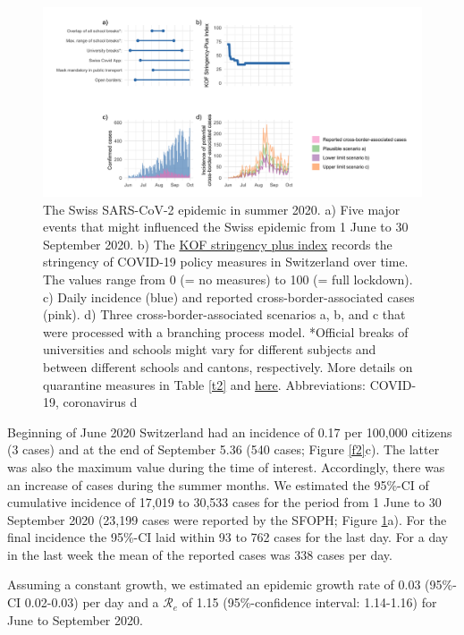 \documentclass[10pt, a4paper, twoside]{article}
\begin{document}
\begin{multicols}{2}
\begin{figure}
\centering
\includegraphics[scale=0.15]{Figure1_2021-06-02.png}
\caption{The Swiss SARS-CoV-2 epidemic in summer 2020.
a) Five major events that might influenced the Swiss epidemic from 1 June to 30 September 2020.
b) The \href{https://kof.ethz.ch/en/forecasts-and-indicators/indicators/kof-stringency-index.html}{KOF stringency plus index} records the stringency of COVID-19 policy measures in Switzerland over time.
The values range from 0 (= no measures) to 100 (= full lockdown).
c) Daily incidence (blue) and reported cross-border-associated cases (pink).
d) Three cross-border-associated scenarios a, b, and c that were processed with a branching process model.
*Official breaks of universities and schools might vary for different subjects and between different schools and cantons, respectively.
More details on quarantine measures in Table \ref{t2} and \href{https://www.fedlex.admin.ch/eli/cc/2021/61/de}{here}.
Abbreviations: COVID-19, coronavirus d}
\label{f1}
\end{figure}

Beginning of June 2020 Switzerland had an incidence of 0.17 per 100,000 citizens (3 cases) and at the end of September 5.36 (540 cases; Figure \ref{f2}c).
The latter was also the maximum value during the time of interest.
Accordingly, there was an increase of cases during the summer months.
We estimated the 95\%-CI of cumulative incidence of 17,019 to 30,533 cases for the period from 1 June to 30 September 2020 (23,199 cases were reported by the SFOPH; Figure \ref{f1}a).
For the final incidence the 95\%-CI laid within 93 to 762 cases for the last day.
For a day in the last week the mean of the reported cases was 338 cases per day.

Assuming a constant growth, we estimated an epidemic growth rate of 0.03 (95\%-CI 0.02-0.03) per day and a $\mathcal{R}_e$ of 1.15 (95\%-confidence interval: 1.14-1.16) for June to September 2020.



\end{multicols}
\end{document}
